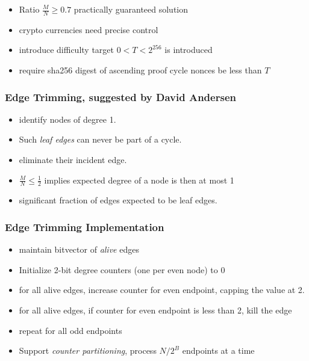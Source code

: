 \documentclass{beamer}
\begin{document}

\begin{frame}
\begin{itemize}
\frametitle{Difficulty control}
\item 
Ratio $\frac{M}{N} \geq 0.7$ practically guaranteed solution
\pause
\item
crypto currencies need precise control
\pause


\item
introduce difficulty target $0 < T < 2^{256}$ is introduced
\pause
\item
require sha256 digest of ascending proof cycle nonces be less than $T$
\end{itemize}
\end{frame}

\begin{frame}
\frametitle{Edge Trimming, suggested by David Andersen}
\begin{itemize}
\item
identify nodes of degree 1.
\item 
Such {\em leaf edges} can never be part of a cycle.
\item
eliminate their incident edge.
\item $\frac{M}{N} \leq \frac{1}{2}$ implies expected degree of a node is then at most 1
\item
significant fraction of edges expected to be leaf edges.
\end{itemize}
\end{frame}

\begin{frame}
\frametitle{Edge Trimming Implementation}
\begin{itemize}
\item
maintain bitvector of {\em alive} edges
\pause
\item
Initialize 2-bit degree counters (one per even node) to 0
\pause
\item
for all alive edges, increase counter for even endpoint,
capping the value at 2.
\pause
\item
for all alive edges, if counter for even endpoint is less than 2,
kill the edge
\pause
\item repeat for all odd endpoints
\pause
\item 
Support {\em counter partitioning}, process $N / 2^{B}$ endpoints at a time
\end{itemize}
\end{frame}
\end{document}
